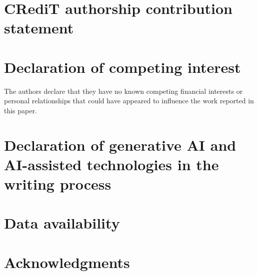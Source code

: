 \documentclass[preprint,12pt]{elsarticle}
\begin{document}
\section*{CRediT authorship contribution statement}
%

\section*{Declaration of competing interest}
The authors declare that they have no known competing financial interests or
personal relationships that could have appeared to influence the work reported
in this paper.

\section*{Declaration of generative AI and AI-assisted technologies in the writing process}

\section*{Data availability}

\section*{Acknowledgments}


\end{document}
